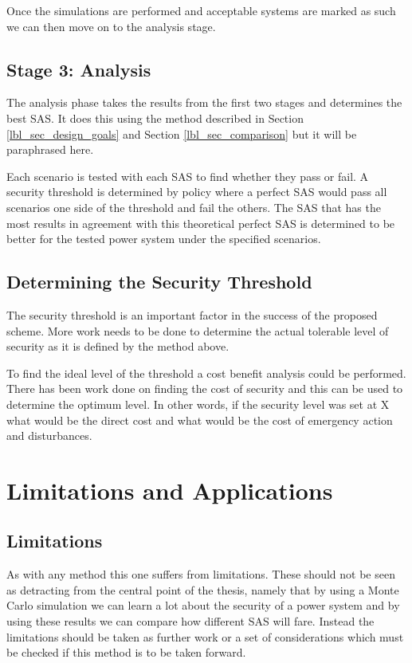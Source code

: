 \documentclass[a4paper,oneside,12pt]{report}
\begin{document}
Once the simulations are performed and acceptable systems are marked as such we can then move on to the analysis stage.

\subsection{Stage 3: Analysis}

The analysis phase takes the results from the first two stages and determines the best SAS. It does this using the method described in Section \ref{lbl_sec_design_goals} and Section \ref{lbl_sec_comparison} but it will be paraphrased here.

Each scenario is tested with each SAS to find whether they pass or fail. A security threshold is determined by policy where a perfect SAS would pass all scenarios one side of the threshold and fail the others. The SAS that has the most results in agreement with this theoretical perfect SAS is determined to be better for the tested power system under the specified scenarios.

\subsection{Determining the Security Threshold}

The security threshold is an important factor in the success of the proposed scheme. More work needs to be done to determine the actual tolerable level of security as it is defined by the method above.

To find the ideal level of the threshold a cost benefit analysis could be performed. There has been work done on finding the cost of security \cite{Bell1999, Kirschen2003} and this can be used to determine the optimum level. In other words, if the security level was set at X what would be the direct cost and what would be the cost of emergency action and disturbances.

\section{Limitations and Applications}

\subsection{Limitations} \label{sec_limitations}

As with any method this one suffers from limitations. These should not be seen as detracting from the central point of the thesis, namely that by using a Monte Carlo simulation we can learn a lot about the security of a power system and by using these results we can compare how different SAS will fare. Instead the limitations should be taken as further work or a set of considerations which must be checked if this method is to be taken forward.
\end{document}
